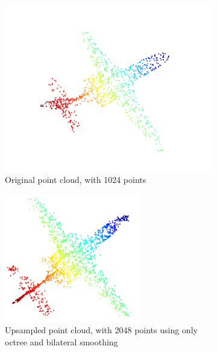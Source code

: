\begin{figure}[!ht]
	\centering
	\begin{subfigure}{0.3\textwidth}
		\centering
		\includegraphics[width=\textwidth]{1024_no_upsampling.png}
		\caption{Original point cloud, with 1024 points}
	\end{subfigure}
	\begin{subfigure}{0.3\textwidth}
		\centering
		\includegraphics[width=0.65\textwidth]{./2048_octree_bilateral}
		\caption{Upsampled point cloud, with 2048 points using only octree and bilateral smoothing}
	\end{subfigure}
	\begin{subfigure}{0.3\textwidth}
		\centering

\end{subfigure}
\end{figure}
